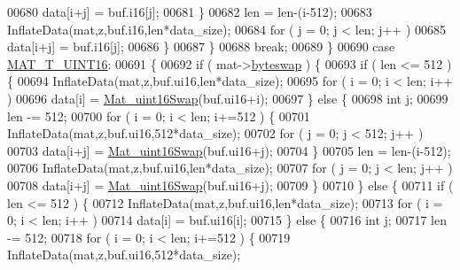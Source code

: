 \begin{DoxyCode}
00680                             data[i+j] = buf.i16[j];
00681                     \}
00682                     len = len-(i-512);
00683                     InflateData(mat,z,buf.i16,len*data\_size);
00684                     \textcolor{keywordflow}{for} ( j = 0; j < len; j++ )
00685                         data[i+j] = buf.i16[j];
00686                 \}
00687             \}
00688             \textcolor{keywordflow}{break};
00689         \}
00690         \textcolor{keywordflow}{case} \hyperlink{group___m_a_t_ggacf7b3b879282b7ab3a51190e49bf3453a05bc7af7680aa68be95126ae0a4c2e31}{MAT\_T\_UINT16}:
00691         \{
00692             \textcolor{keywordflow}{if} ( mat->\hyperlink{struct__mat__t_a99d207977af5e04941ace56d71817a40}{byteswap} ) \{
00693                 \textcolor{keywordflow}{if} ( len <= 512 )\{
00694                     InflateData(mat,z,buf.ui16,len*data\_size);
00695                     \textcolor{keywordflow}{for} ( i = 0; i < len; i++ )
00696                         data[i] = \hyperlink{endian_8c_a0fd527794c69f2872e80a6f20cd09fd2}{Mat\_uint16Swap}(buf.ui16+i);
00697                 \} \textcolor{keywordflow}{else} \{
00698                     \textcolor{keywordtype}{int} j;
00699                     len -= 512;
00700                     \textcolor{keywordflow}{for} ( i = 0; i < len; i+=512 ) \{
00701                         InflateData(mat,z,buf.ui16,512*data\_size);
00702                         \textcolor{keywordflow}{for} ( j = 0; j < 512; j++ )
00703                             data[i+j] = \hyperlink{endian_8c_a0fd527794c69f2872e80a6f20cd09fd2}{Mat\_uint16Swap}(buf.ui16+j);
00704                     \}
00705                     len = len-(i-512);
00706                     InflateData(mat,z,buf.ui16,len*data\_size);
00707                     \textcolor{keywordflow}{for} ( j = 0; j < len; j++ )
00708                         data[i+j] = \hyperlink{endian_8c_a0fd527794c69f2872e80a6f20cd09fd2}{Mat\_uint16Swap}(buf.ui16+j);
00709                 \}
00710             \} \textcolor{keywordflow}{else} \{
00711                 \textcolor{keywordflow}{if} ( len <= 512 ) \{
00712                     InflateData(mat,z,buf.ui16,len*data\_size);
00713                     \textcolor{keywordflow}{for} ( i = 0; i < len; i++ )
00714                         data[i] = buf.ui16[i];
00715                 \} \textcolor{keywordflow}{else} \{
00716                     \textcolor{keywordtype}{int} j;
00717                     len -= 512;
00718                     \textcolor{keywordflow}{for} ( i = 0; i < len; i+=512 ) \{
00719                         InflateData(mat,z,buf.ui16,512*data\_size);

\end{DoxyCode}
